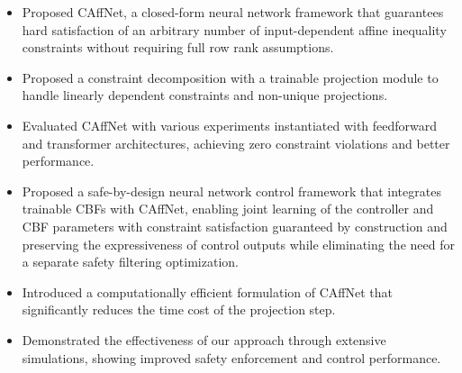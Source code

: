 \documentclass[11pt,letterpaper]{article}
\begin{document}
\begin{itemize}
  \item Proposed CAffNet, a closed-form neural network framework that guarantees hard satisfaction of an arbitrary number of input-dependent affine inequality constraints without requiring full row rank assumptions.
  \item Proposed a constraint decomposition with a trainable projection module to handle linearly dependent constraints and non-unique projections.
  \item Evaluated CAffNet with various experiments instantiated with feedforward and transformer architectures, achieving zero constraint violations and better performance.
\end{itemize}
\begin{itemize}
  \item Proposed a safe-by-design neural network control framework that integrates trainable CBFs with CAffNet, enabling joint learning of the controller and CBF parameters with constraint satisfaction guaranteed by construction and preserving the expressiveness of control outputs while eliminating the need for a separate safety filtering optimization.
  \item Introduced a computationally efficient formulation of CAffNet that significantly reduces the time cost of the projection step.
  \item Demonstrated the effectiveness of our approach through extensive simulations, showing improved safety enforcement and control performance.
\end{itemize}
\end{document}
